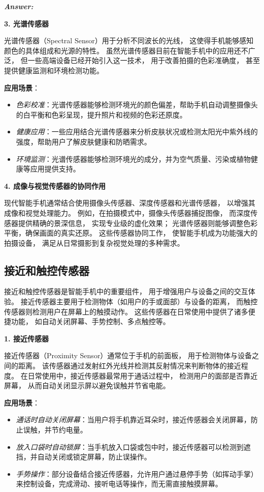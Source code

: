 \documentclass[12pt]{article}
\newenvironment{Answer}{
  \vspace{12pt}
  {\large\textbf{\textit{\hspace{-12pt}Answer:}}}\par
  \vspace{8pt}
} {\vspace{24pt}}
\begin{document}
\begin{Answer}
\noindent\textbf{3. 光谱传感器}\noindent

光谱传感器（Spectral Sensor）用于分析不同波长的光线，
这使得手机能够感知颜色的具体组成和光源的特性。
虽然光谱传感器目前在智能手机中的应用还不广泛，
但一些高端设备已经开始引入这一技术，
用于改善拍摄的色彩准确度，
甚至提供健康监测和环境检测功能。

\textbf{应用场景}：
\begin{itemize}
    \item \textit{色彩校准}：光谱传感器能够检测环境光的颜色偏差，帮助手机自动调整摄像头的白平衡和色彩呈现，提升照片和视频的色彩还原度。
    \item \textit{健康应用}：一些应用结合光谱传感器来分析皮肤状况或检测太阳光中紫外线的强度，帮助用户了解皮肤健康和防晒需求。
    \item \textit{环境监测}：光谱传感器能够检测环境光的成分，并为空气质量、污染或植物健康等应用提供支持。
\end{itemize}

\noindent\textbf{4. 成像与视觉传感器的协同作用}\noindent

现代智能手机通常结合使用摄像头传感器、深度传感器和光谱传感器，
以增强其成像和视觉处理能力。
例如，在拍摄模式中，摄像头传感器捕捉图像，
而深度传感器提供精确的景深信息，
实现专业级的虚化效果；
光谱传感器则能够调整色彩平衡，确保画面的真实还原。
这些传感器协同工作，
使智能手机成为功能强大的拍摄设备，
满足从日常摄影到复杂视觉处理的多种需求。

\subsection*{接近和触控传感器}\noindent

接近和触控传感器是智能手机中的重要组件，
用于增强用户与设备之间的交互体验。
接近传感器主要用于检测物体（如用户的手或面部）与设备的距离，
而触控传感器则检测用户在屏幕上的触摸动作。
这些传感器在日常使用中提供了诸多便捷功能，
如自动关闭屏幕、手势控制、多点触控等。

\noindent\textbf{1. 接近传感器}\noindent

接近传感器（Proximity Sensor）通常位于手机的前面板，
用于检测物体与设备之间的距离。
该传感器通过发射红外光线并检测其反射情况来判断物体的接近程度。
在日常使用中，接近传感器最常用于通话过程中，
检测用户的面部是否靠近屏幕，
从而自动关闭显示屏以避免误触并节省电能。

\textbf{应用场景}：
\begin{itemize}
    \item \textit{通话时自动关闭屏幕}：当用户将手机靠近耳朵时，接近传感器会关闭屏幕，防止误触，并节约电量。
    \item \textit{放入口袋时自动锁屏}：当手机放入口袋或包中时，接近传感器可以检测到遮挡，并自动关闭或锁定屏幕，防止误操作。
    \item \textit{手势操作}：部分设备结合接近传感器，允许用户通过悬停手势（如挥动手掌）来控制设备，完成滑动、接听电话等操作，而无需直接触摸屏幕。
\end{itemize}


\end{Answer}
\end{document}
